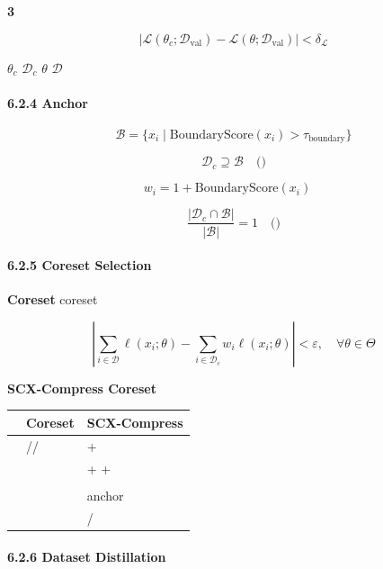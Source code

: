 \documentclass[
  12pt,
]{article}
\begin{document}
\textbf{ 3}

\[
\left| \mathcal{L}(\theta_c; \mathcal{D}_{\text{val}}) - \mathcal{L}(\theta; \mathcal{D}_{\text{val}}) \right| < \delta_{\mathcal{L}}
\]

 \(\theta_c\)  \(\mathcal{D}_c\) \(\theta\) 
\(\mathcal{D}\) 

\paragraph{6.2.4  Anchor
}\label{ux8fb9ux754c-anchor-ux4fddux7559ux7b56ux7565}



\[
\mathcal{B} = \{ x_i \mid \text{BoundaryScore}(x_i) > \tau_{\text{boundary}} \}
\]

\[
\mathcal{D}_c \supseteq \mathcal{B} \quad \text{()}
\]

\textbf{}

\[
w_i = 1 + \text{BoundaryScore}(x_i) \quad \text{}
\]

\textbf{}

\[
\frac{|\mathcal{D}_c \cap \mathcal{B}|}{|\mathcal{B}|} = 1 \quad \text{()}
\]

\paragraph{6.2.5  Coreset Selection
}\label{ux4e0e-coreset-selection-ux7684ux5173ux7cfb}

\textbf{
Coreset} coreset


\[
\left| \sum_{i \in \mathcal{D}} \ell(x_i; \theta) - \sum_{i \in \mathcal{D}_c} w_i \ell(x_i; \theta) \right| < \varepsilon, \quad \forall \theta \in \Theta
\]

\textbf{SCX-Compress  Coreset}

\begin{longtable}[]{@{}lll@{}}
\toprule\noalign{}
 &  Coreset & SCX-Compress \\
\midrule\noalign{}
\endhead
\bottomrule\noalign{}
\endlastfoot
 & // &  +  \\
 &  &  +  +  \\
 &  &  \\
 &  &  anchor \\
 &  & / \\
\end{longtable}

\paragraph{6.2.6  Dataset Distillation
}\label{ux4e0e-dataset-distillation-ux7684ux5173ux7cfb}
\end{document}
